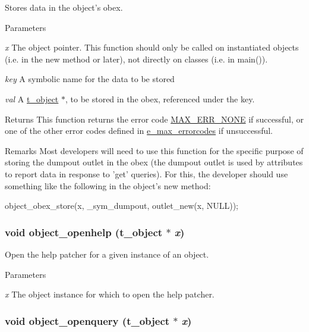 Stores data in the object's obex. 
\begin{DoxyParams}{Parameters}
\item[{\em x}]The object pointer. This function should only be called on instantiated objects (i.e. in the {\ttfamily new} method or later), not directly on classes (i.e. in {\ttfamily main()}). \item[{\em key}]A symbolic name for the data to be stored \item[{\em val}]A \hyperlink{structt__object}{t\_\-object} $\ast$, to be stored in the obex, referenced under the {\ttfamily key}.\end{DoxyParams}
\begin{DoxyReturn}{Returns}
This function returns the error code \hyperlink{group__misc_gga0764dd6c02b76cca7d053ae50555d69da6d22f77fef8b1e1b074cef5d29d935fd}{MAX\_\-ERR\_\-NONE} if successful, or one of the other error codes defined in \hyperlink{group__misc_ga0764dd6c02b76cca7d053ae50555d69d}{e\_\-max\_\-errorcodes} if unsuccessful.
\end{DoxyReturn}
\begin{DoxyRemark}{Remarks}
Most developers will need to use this function for the specific purpose of storing the dumpout outlet in the obex (the dumpout outlet is used by attributes to report data in response to 'get' queries). For this, the developer should use something like the following in the object's {\ttfamily new} method: 
\begin{DoxyCode}
    object_obex_store(x, _sym_dumpout, outlet_new(x, NULL));
\end{DoxyCode}
 
\end{DoxyRemark}
\hypertarget{group__obj_gac4eb1b3d30abbbb754ddc38701ff1c77}{
\subsubsection[{object\_\-openhelp}]{\setlength{\rightskip}{0pt plus 5cm}void object\_\-openhelp ({\bf t\_\-object} $\ast$ {\em x})}}
\label{group__obj_gac4eb1b3d30abbbb754ddc38701ff1c77}


Open the help patcher for a given instance of an object. 
\begin{DoxyParams}{Parameters}
\item[{\em x}]The object instance for which to open the help patcher. \end{DoxyParams}
\hypertarget{group__obj_ga6d212c17722cc783102a6f5a623596c9}{
\subsubsection[{object\_\-openquery}]{\setlength{\rightskip}{0pt plus 5cm}void object\_\-openquery ({\bf t\_\-object} $\ast$ {\em x})}}
\label{group__obj_ga6d212c17722cc783102a6f5a623596c9}


